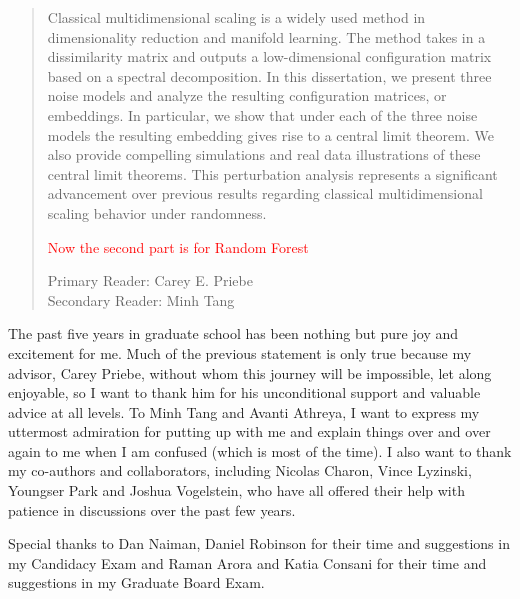 \begin{frontmatter}

\maketitle

\begin{abstract}
Classical multidimensional scaling is a widely used method in dimensionality reduction and manifold learning. 
The method takes in a dissimilarity matrix and outputs a low-dimensional configuration matrix based on a spectral decomposition. 
In this dissertation, we present three noise models and analyze the resulting configuration matrices, or embeddings. 
In particular, we show that under each of the three noise models the resulting embedding gives rise to a central limit theorem. We also provide compelling simulations and real data illustrations of these central limit theorems. This perturbation analysis represents a significant advancement over previous results regarding classical multidimensional scaling behavior under randomness.

\textcolor{red}{Now the second part is for Random Forest}


\vspace{1cm}

\noindent Primary Reader: Carey E. Priebe\\
Secondary Reader: Minh Tang

\end{abstract}

\begin{acknowledgment}

The past five years in graduate school has been nothing but pure joy and excitement for me. Much of the previous statement is only true because my advisor, Carey Priebe, without whom this journey will be impossible, let along enjoyable, so I want to thank him for his unconditional support and valuable advice at all levels. To Minh Tang and Avanti Athreya, I want to express my uttermost admiration for putting up with me and explain things over and over again to me when I am confused (which is most of the time). I also want to thank my co-authors and collaborators, including Nicolas Charon, Vince Lyzinski, Youngser Park and Joshua Vogelstein, who have all offered their help with patience in discussions over the past few years.


Special thanks to Dan Naiman, Daniel Robinson for their time and suggestions in my Candidacy Exam and Raman Arora and 
Katia Consani for their time and suggestions in my Graduate Board Exam.


\end{acknowledgment}
\end{frontmatter}
